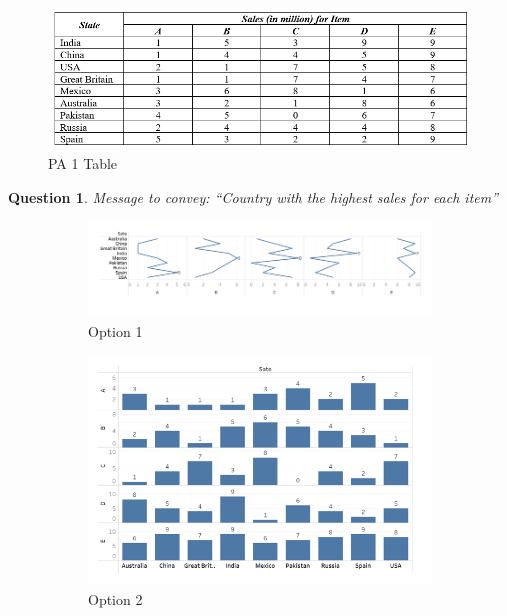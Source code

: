 \documentclass[11pt,fleqn]{book} %
\newtheorem{question}{Question}
\begin{document}
\begin{example}
\begin{figure}[hitb!]
  \centering
  \includegraphics[width=0.7\linewidth]{Pictures/PA1b.png}
  \caption{PA 1 Table}
  \label{fig:pa1-table}
\end{figure}

\begin{question}
Message to convey: “Country with the highest sales for each item”
\end{question}
\begin{figure}[hitb!]
  \centering
  \begin{subfigure}[c]{0.75\linewidth}
    \includegraphics[width=\linewidth]{Pictures/op1.png}
    \caption{Option 1}
    \label{fig:pa1-op1}
  \end{subfigure}
  \hfill
  \begin{subfigure}[c]{0.35\linewidth}
    \includegraphics[width=\linewidth]{Pictures/op2.png}
    \caption{Option 2}
    \label{fig:pa1-op2}
  \end{subfigure}
  \begin{subfigure}[c]{0.35\linewidth}

\end{subfigure}
\end{figure}
\end{example}
\end{document}
